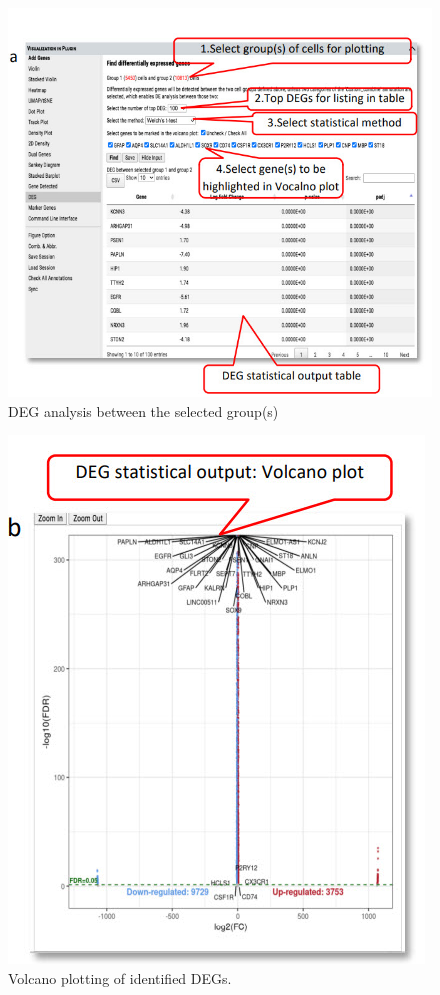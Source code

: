 \documentclass[
]{article}
\begin{document}
\begin{figure}
\centering
\includegraphics{figures/F19A.jpg}
\caption{DEG analysis between the selected group(s)}
\end{figure}

\begin{figure}
\centering
\includegraphics{figures/F19B.jpg}
\caption{Volcano plotting of identified DEGs.}
\end{figure}
\end{document}
